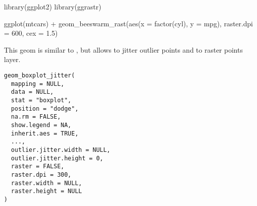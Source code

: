 \documentclass[a4paper]{book}
\begin{document}
%
\begin{Examples}
\begin{ExampleCode}
library(ggplot2)
library(ggrastr)

ggplot(mtcars) + geom_beeswarm_rast(aes(x = factor(cyl), y = mpg), raster.dpi = 600, cex = 1.5)

\end{ExampleCode}
\end{Examples}
%
\begin{Description}\relax
This geom is similar to , but allows to jitter outlier points and to raster points layer.
\end{Description}
%
\begin{Usage}
\begin{verbatim}
geom_boxplot_jitter(
  mapping = NULL,
  data = NULL,
  stat = "boxplot",
  position = "dodge",
  na.rm = FALSE,
  show.legend = NA,
  inherit.aes = TRUE,
  ...,
  outlier.jitter.width = NULL,
  outlier.jitter.height = 0,
  raster = FALSE,
  raster.dpi = 300,
  raster.width = NULL,
  raster.height = NULL
)
\end{verbatim}
\end{Usage}
%
\end{document}
